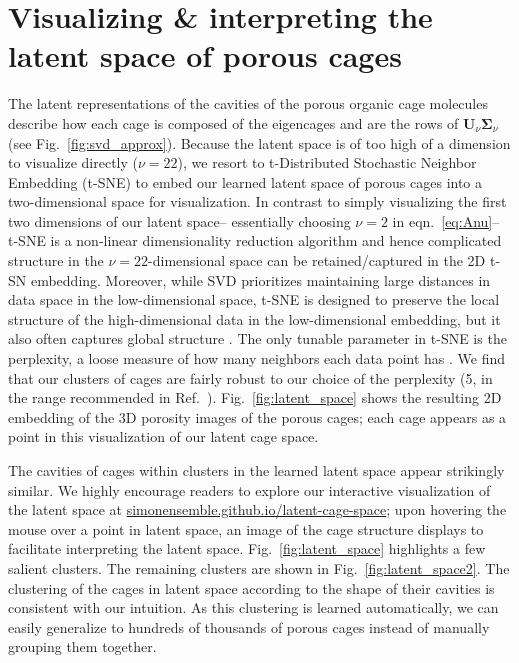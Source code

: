\documentclass[journal=jacsat,manuscript=article,layout=traditional]{achemso}
\begin{document}
\section{\color{red} Visualizing \& interpreting the latent space of porous cages} 
The latent representations of the cavities of the porous organic cage molecules describe how each cage is composed of the eigencages and are the rows of $\mathbf{U}_\nu \mathbf{\Sigma}_\nu$ (see Fig.~\ref{fig:svd_approx}). {\color{red} Because the latent space is of too high of a dimension to visualize directly ($\nu=22$), we resort to t-Distributed Stochastic Neighbor Embedding (t-SNE) \cite{maaten2008visualizing,wattenberg2016how} to embed our learned latent space of porous cages into a two-dimensional space for visualization. 
In contrast to simply visualizing the first two dimensions of our latent space-- essentially choosing $\nu=2$ in eqn.~\ref{eq:Anu}-- t-SNE is a non-linear dimensionality reduction algorithm and hence complicated structure in the $\nu=22$-dimensional space can be retained/captured in the 2D t-SN embedding. Moreover, while  SVD prioritizes maintaining large distances in data space in the low-dimensional space, t-SNE is designed to preserve the local structure of the high-dimensional data in the low-dimensional embedding, but it also often captures global structure \cite{maaten2008visualizing}. 
The only tunable parameter in t-SNE is the perplexity, a loose measure of how many neighbors each data point has \cite{maaten2008visualizing,wattenberg2016how}. We find that our clusters of cages are fairly robust to our choice of the perplexity (5, in the range recommended in Ref.~\cite{maaten2008visualizing}).
} Fig.~\ref{fig:latent_space} shows the resulting 2D embedding of the 3D porosity images of the porous cages; each cage appears as a point in this visualization of our latent cage space.

The cavities of cages within clusters in the learned latent space appear strikingly similar.
We highly encourage readers to explore our interactive visualization of the latent space at \url{simonensemble.github.io/latent-cage-space}; upon hovering the mouse over a point in latent space, an image of the cage structure displays to facilitate interpreting the latent space. Fig.~\ref{fig:latent_space} highlights a few salient clusters. The remaining clusters are shown in Fig.~\ref{fig:latent_space2}. The clustering of the cages in latent space according to the shape of their cavities is consistent with our intuition. As this clustering is learned automatically, we can easily generalize to hundreds of thousands of porous cages instead of manually grouping them together. 
\end{document}
